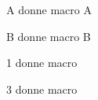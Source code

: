 \documentclass{scrartcl}
\begin{document}
A donne macro {\texas A}


B donne macro {\texas B}


1 donne macro {}


3 donne macro {}
\end{document}
